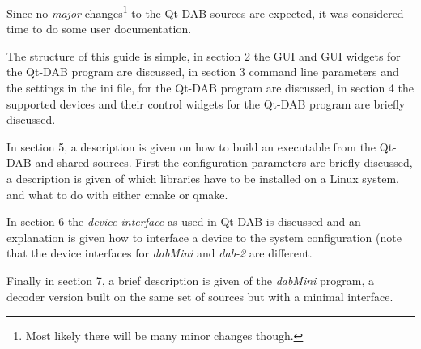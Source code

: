 \documentclass[12pt]{article}
\begin{document}
Since no {\em major} changes\footnote{Most likely there will be many
minor changes though.} to the Qt-DAB sources are expected, it
was considered time to do some user documentation.
\par
The structure of this guide is simple, in section 2 the GUI and GUI
widgets for the Qt-DAB program are discussed, in section 3
command line parameters and the settings in the ini file,
for the Qt-DAB program are discussed,
in section 4 the supported devices and their control widgets
for the Qt-DAB program are briefly discussed.
\par
In section 5, a description is given on how to build an
executable from the Qt-DAB and shared sources.
First the configuration parameters are briefly discussed,
a  description is given of  which libraries have to be
installed on a Linux system,
and what to do with either cmake or qmake.
\par
In section 6 the {\em device interface} as used in Qt-DAB
is discussed and an explanation is given how to interface a device
to the system configuration (note that the device interfaces for {\em dabMini}
and {\em dab-2} are different.
\par
Finally in section 7, a brief description is given of the {\em dabMini}
program,
a decoder version built on the same set of sources but with a minimal
interface.
\end{document}
